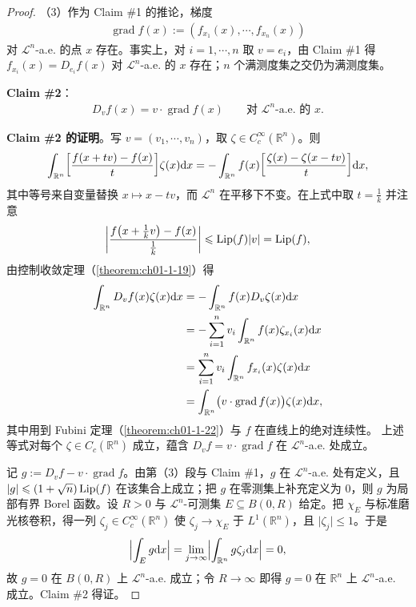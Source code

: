 \documentclass[../../main.tex]{subfiles}%
\begin{document}
\begin{proof}
（3）作为 Claim \#1 的推论，梯度
\begin{align*}
\operatorname{grad}f(x):=(f_{x_1}(x),\cdots,f_{x_n}(x))
\end{align*}
对 $\mathcal{L}^n$-a.e. 的点 $x$ 存在。事实上，对 $i=1,\cdots,n$ 取 $v=e_i$，由 Claim \#1 得 $f_{x_i}(x)=D_{e_i}f(x)$ 对 $\mathcal{L}^n$-a.e. 的 $x$ 存在；$n$ 个满测度集之交仍为满测度集。

\textbf{Claim \#2}：
\begin{align*}
D_vf(x)=v\cdot\operatorname{grad}f(x)\qquad\text{对 } \mathcal{L}^n\text{-a.e. 的 } x.
\end{align*}

\textbf{Claim \#2 的证明}。写 $v=(v_1,\cdots,v_n)$，取 $\zeta\in C_c^{\infty}(\mathbb{R}^n)$。则
\begin{align*}
\int_{\mathbb{R}^n}\biggl[\frac{f(x+tv)-f(x)}{t}\biggr]\zeta(x)\mathrm{d} x
=-\int_{\mathbb{R}^n}f(x)\biggl[\frac{\zeta(x)-\zeta(x-tv)}{t}\biggr]\mathrm{d} x,
\end{align*}
其中等号来自变量替换 $x\mapsto x-tv$，而 $\mathcal{L}^n$ 在平移下不变。在上式中取 $t=\frac1k$ 并注意
\begin{align*}
\biggl\lvert\frac{f\bigl(x+\frac1k v\bigr)-f(x)}{\frac1k}\biggr\rvert\leqslant\operatorname{Lip}(f)\lvert v\rvert=\operatorname{Lip}(f),
\end{align*}
由控制收敛定理（\cref{theorem:ch01-1-19}）得%
\begin{align*}
\int_{\mathbb{R}^n}D_vf(x)\zeta(x)\mathrm{d} x
&=-\int_{\mathbb{R}^n}f(x)D_v\zeta(x)\mathrm{d} x\\
&=-\sum_{i=1}^n v_i\int_{\mathbb{R}^n}f(x)\zeta_{x_i}(x)\mathrm{d} x\\
&=\sum_{i=1}^n v_i\int_{\mathbb{R}^n}f_{x_i}(x)\zeta(x)\mathrm{d} x\\
&=\int_{\mathbb{R}^n}\bigl(v\cdot\operatorname{grad}f(x)\bigr)\zeta(x)\mathrm{d} x,
\end{align*}
其中用到 Fubini 定理（\cref{theorem:ch01-1-22}）与 $f$ 在直线上的绝对连续性。%
上述等式对每个 $\zeta\in C_c(\mathbb{R}^n)$ 成立，蕴含 $D_vf=v\cdot\operatorname{grad}f$ 在 $\mathcal{L}^n$-a.e. 处成立。

记 $g:=D_vf-v\cdot\operatorname{grad}f$。由第（3）段与 Claim \#1，$g$ 在 $\mathcal{L}^n$-a.e. 处有定义，且 $\lvert g\rvert\leqslant(1+\sqrt{n})\operatorname{Lip}(f)$ 在该集合上成立；把 $g$ 在零测集上补充定义为 $0$，则 $g$ 为局部有界 Borel 函数。设 $R>0$ 与 $\mathcal{L}^n$-可测集 $E\subseteq B(0,R)$ 给定。把 $\chi_E$ 与标准磨光核卷积，得一列 $\zeta_j\in C_c^{\infty}(\mathbb{R}^n)$ 使 $\zeta_j\to\chi_E$ 于 $L^1(\mathbb{R}^n)$，且 $\lvert\zeta_j\rvert\leqslant1$。于是
\begin{align*}
\Bigl\lvert\int_E g\mathrm{d} x\Bigr\rvert
=\lim_{j\to\infty}\Bigl\lvert\int_{\mathbb{R}^n}g\zeta_j\mathrm{d} x\Bigr\rvert=0,
\end{align*}
故 $g=0$ 在 $B(0,R)$ 上 $\mathcal{L}^n$-a.e. 成立；令 $R\to\infty$ 即得 $g=0$ 在 $\mathbb{R}^n$ 上 $\mathcal{L}^n$-a.e. 成立。Claim \#2 得证。


\end{proof}
\end{document}
